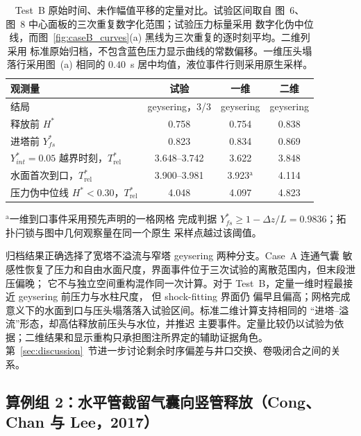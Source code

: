 \documentclass[preprint,12pt]{elsarticle}
\begin{document}
\begin{table}[htbp]
\centering
\caption{Test~B 原始时间、未作幅值平移的定量对比。试验区间取自
\cite{vasconcelos2011} 图~6、图~8 中心面板的三次重复数字化范围；试验压力标量采用
数字化伪中位线，而图~\ref{fig:caseB_curves}(a) 黑线为三次重复的逐时刻平均。二维列采用
标准原始归档，不包含蓝色压力显示曲线的常数偏移。一维压头塌落行采用图~(a) 相同的
$0.40$~s 居中均值，液位事件行则采用原生采样。}
\label{tab:caseB_summary}
\begin{tabular}{lccc}
\toprule
观测量 & 试验 & 一维 & 二维 \\
\midrule
结局 & geysering，3/3 & geysering & geysering \\
释放前 $H^{*}$ & 0.758 & 0.754 & 0.838 \\
进塔前 $Y^{*}_{fs}$ & 0.823 & 0.834 & 0.869 \\
$Y^{*}_{int}=0.05$ 越界时刻，$T_{\mathrm{rel}}^{*}$ & 3.648--3.742 & 3.622 & 3.848 \\
水面首次到口，$T_{\mathrm{rel}}^{*}$ & 3.900--3.981 & 3.923$^{\mathrm{a}}$ & 4.114 \\
压力伪中位线 $H^{*}<0.30$，$T_{\mathrm{rel}}^{*}$ & 4.048 & 4.097 & 4.823 \\
\bottomrule
\end{tabular}
\vspace{0.3em}

\parbox{0.98\linewidth}{\footnotesize $^{\mathrm{a}}$一维到口事件采用预先声明的一格网格
完成判据 $Y^{*}_{fs}\ge 1-\Delta z/L=0.9836$；拓扑闩锁与图中几何观察量在同一个原生
采样点越过该阈值。}
\end{table}

\FloatBarrier

归档结果正确选择了宽塔不溢流与窄塔 geysering 两种分支。Case~A 连通气囊
敏感性恢复了压力和自由水面尺度，界面事件位于三次试验的离散范围内，但末段泄压偏晚；
它不与独立空间重构混作同一次计算。对于 Test~B，定量一维时程最接近 geysering 前压力与水柱尺度，
但 shock-fitting 界面仍
偏早且偏高；网格完成意义下的水面到口与压头塌落落入试验区间。标准二维计算支持相同的
``进塔--溢流''形态，却高估释放前压头与水位，并推迟
主要事件。定量比较仍以试验为依据；二维结果和显示重构只承担图注所界定的辅助证据角色。
第~\ref{sec:discussion}~节进一步讨论剩余时序偏差与井口交换、卷吸闭合之间的关系。

\FloatBarrier

\subsection{算例组 2：水平管截留气囊向竖管释放（Cong、Chan 与 Lee，2017）}
\label{sec:tests:cong2017}
\end{document}
